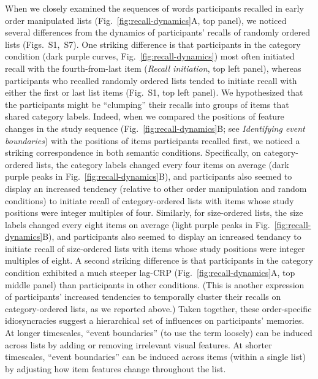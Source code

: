 \documentclass[11pt]{article}
\newcommand{\dynamicsRandom}{S1}
\newcommand{\recallInit}{S7}
\begin{document}
When we closely examined the sequences of words participants recalled in early
order manipulated lists (Fig.~\ref{fig:recall-dynamics}A, top panel), we
noticed several differences from the dynamics of participants' recalls of
randomly ordered lists (Figs.~\dynamicsRandom,~\recallInit). One striking difference is that
participants in the category condition (dark purple curves,
Fig.~\ref{fig:recall-dynamics}) most often initiated recall with the
fourth-from-last item (\textit{Recall initiation}, top left panel), whereas
participants who recalled randomly ordered lists tended to initiate recall with
either the first or last list items (Fig.~\dynamicsRandom, top left panel). We
hypothesized that the participants might be ``clumping'' their recalls into
groups of items that shared category labels. Indeed, when we compared the
positions of feature changes in the study sequence
(Fig.~\ref{fig:recall-dynamics}B; see \textit{Identifying event boundaries})
with the positions of items participants recalled first, we noticed a striking
correspondence in both semantic conditions. Specifically, on category-ordered
lists, the category labels changed every four items on average (dark purple
peaks in Fig.~\ref{fig:recall-dynamics}B), and participants also seemed to
display an increased tendency (relative to other order manipulation and random
conditions) to initiate recall of category-ordered lists with items whose study
positions were integer multiples of four. Similarly, for size-ordered lists,
the size labels changed every eight items on average (light purple peaks in
Fig.~\ref{fig:recall-dynamics}B), and participants also seemed to display an
icnreased tendancy to initiate recall of size-ordered lists with items whose
study positions were integer multiples of eight. A second striking difference
is that participants in the category condition exhibited a much steeper lag-CRP
(Fig.~\ref{fig:recall-dynamics}A, top middle panel) than participants in other
conditions. (This is another expression of participants' increased tendencies
to temporally cluster their recalls on category-ordered lists, as we reported
above.) Taken together, these order-specific idiosyncracies suggest a
hierarchical set of influences on participants' memories. At longer timescales,
``event boundaries'' (to use the term loosely) can be induced across lists by
adding or removing irrelevant visual features. At shorter timescales, ``event
boundaries'' can be induced across items (within a single list) by adjusting
how item features change throughout the list.
\end{document}
